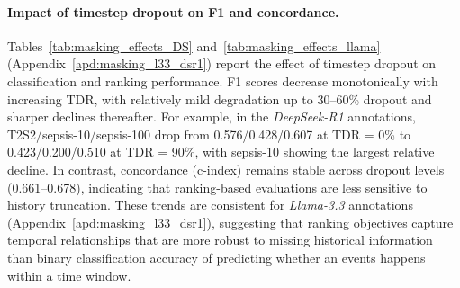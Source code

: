 \paragraph{Impact of timestep dropout on F1 and concordance.}
Tables~\ref{tab:masking_effects_DS} and~\ref{tab:masking_effects_llama} (Appendix~\ref{apd:masking_l33_dsr1}) report the effect of timestep dropout on classification and ranking performance. F1 scores decrease monotonically with increasing TDR, with relatively mild degradation up to 30–60\% dropout and sharper declines thereafter. For example, in the \textit{DeepSeek-R1} annotations, T2S2/sepsis-10/sepsis-100 drop from 0.576/0.428/0.607 at TDR = 0\% to 0.423/0.200/0.510 at TDR = 90\%, with sepsis-10 showing the largest relative decline. In contrast, concordance (c-index) remains stable across dropout levels (0.661–0.678), indicating that ranking-based evaluations are less sensitive to history truncation. These trends are consistent for \textit{Llama-3.3} annotations (Appendix~\ref{apd:masking_l33_dsr1}), suggesting that ranking objectives capture temporal relationships that are more robust to missing historical information than binary classification accuracy of predicting whether an events happens within a time window.



